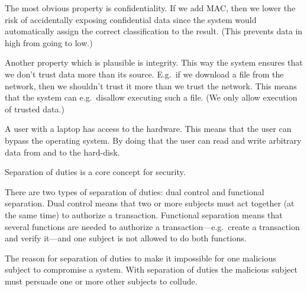 \documentclass[a4paper,addpoints]{exam}
\begin{document}
\begin{questions}
  \begin{solution}
    The most obvious property is confidentiality.
    If we add MAC, then we lower the risk of accidentally exposing confidential 
    data since the system would automatically assign the correct classification 
    to the result.
    (This prevents data in high from going to low.)

    Another property which is plausible is integrity.
    This way the system ensures that we don't trust data more than its source.
    E.g.\ if we download a file from the network, then we shouldn't trust it 
    more than we trust the network.
    This means that the system can e.g.\ disallow executing such a file.
    (We only allow execution of trusted data.)

    A user with a laptop has access to the hardware.
    This means that the user can bypass the operating system.
    By doing that the user can read and write arbitrary data from and to the 
    hard-disk.
  \end{solution}


  \question\label{q:accountability:E:C}
  Separation of duties is a core concept for security.

  \begin{solution}
    There are two types of separation of duties:
    dual control and functional separation.
    Dual control means that two or more subjects must act together (at the same 
    time) to authorize a transaction.
    Functional separation means that several functions are needed to authorize 
    a transaction---e.g.~create a transaction and verify it---and one subject 
    is not allowed to do both functions.

    The reason for separation of duties to make it impossible for one malicious 
    subject to compromise a system.
    With separation of duties the malicious subject must persuade one or more 
    other subjects to collude.
  \end{solution}



\end{questions}
\end{document}
